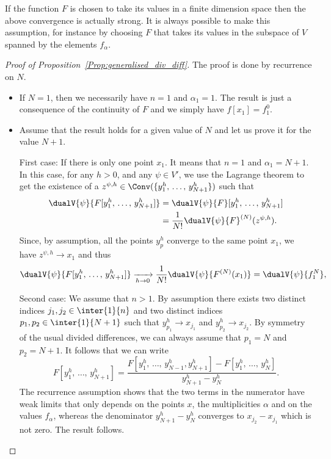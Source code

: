 \begin{rema}
If the function $F$ is chosen to take its values in a finite dimension space then the above convergence is actually strong. It is always possible to make this assumption, for instance by choosing $F$ that takes its values in the subspace of $V$ spanned by the elements $f_\alpha$.
\end{rema}

\begin{proof}[Proof of Proposition~\ref{Prop:generalised_div_diff}]
The proof is done by recurrence on $N$.
\begin{itemize}
\item If $N=1$, then we necessarily have $n=1$ and $\alpha_1=1$. The result is just a consequence of the continuity of $F$ and we simply have $f[x_1]=f_1^0$.

\item Assume that the result holds for a given value of $N$ and let us prove it for the value $N+1$.
\begin{step}{First case:}
If there is only one point $x_1$. It means that $n=1$ and $\alpha_1=N+1$. In this case, for any $h>0$, and any $\psi\in V'$, we use the Lagrange theorem to get the existence of a $z^{\psi,h}\in \Conv(\{y_1^h,\,\dotsc,\,y_{N+1}^h\})$ such that
\begin{align*}
\dualV{\psi}{F[y_1^h,\,\dotsc,\,y_{N+1}^h]} & = \dualV{\psi}{F}[y_1^h,\,\dotsc,\,y_{N+1}^h]
\\
& = \frac{1}{N!} \dualV{\psi}{F}^{(N)}(z^{\psi,h}).
\end{align*}
Since, by assumption, all the points $y_p^h$ converge to the same point $x_1$, we have $z^{\psi,h}\to x_1$ and thus
\[
\dualV{\psi}{F[y_1^h,\,\dotsc,\,y_{N+1}^h]} \xrightarrow[h\to 0]{} \frac{1}{N!} \dualV{\psi}{F^{(N)}(x_1)} = \dualV{\psi}{f_1^N},
\]
\end{step}
\begin{step}{Second case:}
We assume that $n>1$. By assumption there exists two distinct indices $j_1, j_2\in \inter{1}{n}$ and two distinct indices $p_1,p_2\in \inter{1}{N+1}$ such that $y_{p_1}^h \to x_{j_1}$ and $y_{p_2}^h\to x_{j_2}$. By symmetry of the usual divided differences, we can always assume that $p_1=N$ and $p_2=N+1$. It follows that we can write
\[
F\left[y_1^h,\,\dotsc,\,y_{N+1}^h\right] = \frac{ F\left[y_1^h,\,\dotsc,\,y_{N-1}^h,y_{N+1}^h\right] - F\left[y_1^h,\,\dotsc,\,y_{N}^h\right]}{y_{N+1}^h - y_N^h}.
\]
The recurrence assumption shows that the two terms in the numerator have weak limits that only depends on the points $x$, the multiplicities $\alpha$ and on the values $f_\alpha$, whereas the denominator $y_{N+1}^h - y_N^h$ converges to $x_{j_2}-x_{j_1}$ which is not zero. The result follows.
\end{step}
\end{itemize}
\end{proof}


